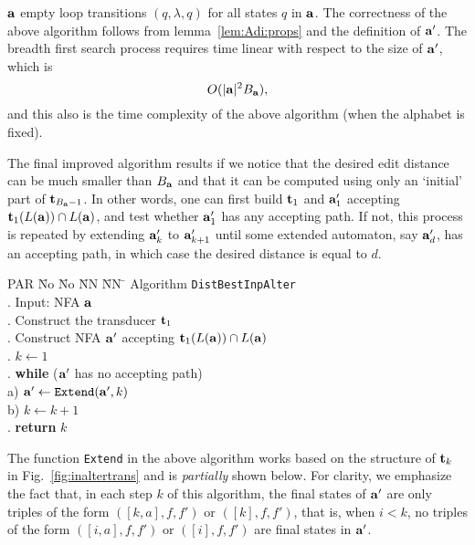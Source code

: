 \documentclass{article}
\theoremstyle{plain}
\theoremstyle{definition}
\theoremstyle{remark}
\newcommand{\e}{\lambda}
\newcommand\tsid{\trt_{k}}
\newcommand\tsidp[1]{\trt_{#1}}
\newcommand\db{B}             \newcommand\dbold{D}   \newcommand\pssi{\par\smallskip\indent}
\begin{document}
$\mathbf{a}$ empty  loop transitions $(q,\e,q)$ for all states
$q$ in $\mathbf{a}$. The correctness of the above algorithm follows
from lemma~\ref{lem:Adi:props} and the definition of
$\mathbf{a}'$. The breadth first search process requires time
linear with respect to the size of $\mathbf{a}'$, which is
\[
O(\sz{\aut}^2\db_{\aut}),
\]
and this also is the time complexity of the above
algorithm (when the alphabet is fixed).
\par
The final improved algorithm results if we notice that
the desired edit distance can be much smaller
than $\db_{\aut}$ and that it can be computed
using only an `initial' part of $\tsidp{{\db_\aut}-1}$.
In other words, one can first build $\tsidp{1}$ and
$\mathbf{a}'_1$ accepting $\tsidp{1}(L(\aut))\cap L(\aut)$, and test whether $\mathbf{a}'_1$ has any accepting path. If not, this
process is repeated by extending $\mathbf{a}'_k$ to $\mathbf{a}'_{k+1}$
until some extended automaton, say $\mathbf{a}'_d$, has an
accepting path, in which case the desired distance is
equal to $d$.
\begin{tabbing}
PAR \= No \= No \= NN \= NN \=\kill
\> Algorithm \texttt{DistBestInpAlter} \\
.\> Input: NFA $\mathbf{a}$ \hspace{4mm} \\
.\> Construct the transducer $\tsidp{1}$ \\
.\> Construct NFA  $\mathbf{a}'$ accepting $\tsidp{1}(L(\aut))\cap L(\aut)$ \\
.\> $k\leftarrow1$ \\
. \>  \textbf{while} ($\mathbf{a}'$ has no accepting path)\\
\>  \>  a)\> $\mathbf{a}'\leftarrow \texttt{Extend}(\mathbf{a}',k)$\\
\>   \> b)\> $k\leftarrow k+1$  \\
. \> \textbf{return} $k$
\end{tabbing}
The function \texttt{Extend} in the above algorithm works
based on the structure of $\tsid$ in Fig.~\ref{fig:inaltertrans} and is \emph{partially} shown below. For clarity,
we emphasize the fact that, in each step $k$ of this algorithm, the final states of $\mathbf{a}'$ are only
triples of the form $([k,a],f,f')$ or $([k],f,f')$, that is,
when $i<k$, no triples of the form $([i,a],f,f')$ or $([i],f,f')$ are final states in $\mathbf{a}'$.
\end{document}
